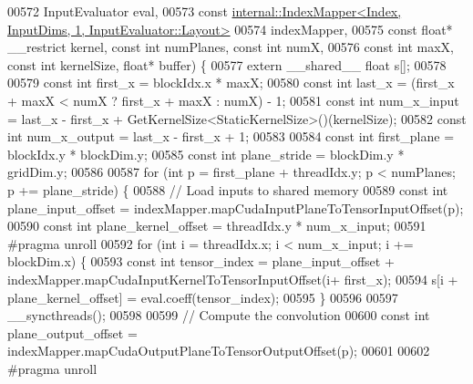 \begin{DoxyCode}
00572     InputEvaluator eval,
00573     \textcolor{keyword}{const} \hyperlink{class_eigen_1_1internal_1_1_index_mapper}{internal::IndexMapper<Index, InputDims, 1, InputEvaluator::Layout>}
00574         indexMapper,
00575     \textcolor{keyword}{const} \textcolor{keywordtype}{float}* \_\_restrict kernel, \textcolor{keyword}{const} \textcolor{keywordtype}{int} numPlanes, \textcolor{keyword}{const} \textcolor{keywordtype}{int} numX,
00576     \textcolor{keyword}{const} \textcolor{keywordtype}{int} maxX, \textcolor{keyword}{const} \textcolor{keywordtype}{int} kernelSize, \textcolor{keywordtype}{float}* buffer) \{
00577   \textcolor{keyword}{extern} \_\_shared\_\_ \textcolor{keywordtype}{float} s[];
00578 
00579   \textcolor{keyword}{const} \textcolor{keywordtype}{int} first\_x = blockIdx.x * maxX;
00580   \textcolor{keyword}{const} \textcolor{keywordtype}{int} last\_x = (first\_x + maxX < numX ? first\_x + maxX : numX) - 1;
00581   \textcolor{keyword}{const} \textcolor{keywordtype}{int} num\_x\_input = last\_x - first\_x + GetKernelSize<StaticKernelSize>()(kernelSize);
00582   \textcolor{keyword}{const} \textcolor{keywordtype}{int} num\_x\_output = last\_x - first\_x + 1;
00583 
00584   \textcolor{keyword}{const} \textcolor{keywordtype}{int} first\_plane = blockIdx.y * blockDim.y;
00585   \textcolor{keyword}{const} \textcolor{keywordtype}{int} plane\_stride = blockDim.y * gridDim.y;
00586 
00587   \textcolor{keywordflow}{for} (\textcolor{keywordtype}{int} p = first\_plane + threadIdx.y; p < numPlanes; p += plane\_stride) \{
00588     \textcolor{comment}{// Load inputs to shared memory}
00589     \textcolor{keyword}{const} \textcolor{keywordtype}{int} plane\_input\_offset = indexMapper.mapCudaInputPlaneToTensorInputOffset(p);
00590     \textcolor{keyword}{const} \textcolor{keywordtype}{int} plane\_kernel\_offset = threadIdx.y * num\_x\_input;
00591 \textcolor{preprocessor}{    #pragma unroll}
00592     \textcolor{keywordflow}{for} (\textcolor{keywordtype}{int} i = threadIdx.x; i < num\_x\_input; i += blockDim.x) \{
00593       \textcolor{keyword}{const} \textcolor{keywordtype}{int} tensor\_index = plane\_input\_offset + indexMapper.mapCudaInputKernelToTensorInputOffset(i+
      first\_x);
00594       s[i + plane\_kernel\_offset] = eval.coeff(tensor\_index);
00595     \}
00596 
00597     \_\_syncthreads();
00598 
00599     \textcolor{comment}{// Compute the convolution}
00600     \textcolor{keyword}{const} \textcolor{keywordtype}{int} plane\_output\_offset = indexMapper.mapCudaOutputPlaneToTensorOutputOffset(p);
00601 
00602 \textcolor{preprocessor}{    #pragma unroll}

\end{DoxyCode}
